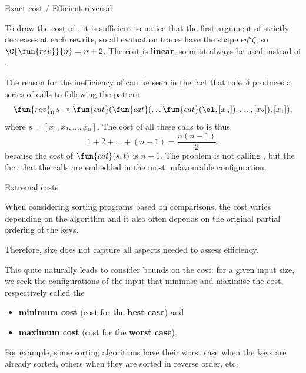%
\begin{frame}{Exact cost / Efficient reversal}

  To draw the cost of , it is sufficient to notice that the
  first argument of  strictly decreases at each rewrite, so
  all evaluation traces have the shape \(\epsilon\eta^n\zeta\), so
  \(\C{\fun{rev}}{n} = n + 2\). The cost is \textbf{linear}, so
   must always be used instead of .

  \bigskip

  The reason for the inefficiency of  can be seen in
  the fact that rule~\(\delta\) produces a series of calls to
   following the pattern
  \begin{equation*}
    \fun{rev}_0\,s \twoheadrightarrow \fun{cat}(\fun{cat}(\dots
    \fun{cat}(\el, [x_n]), \dots, [x_2]), [x_1]),
  \end{equation*}
  where \(s = [x_1, x_2, \dots, x_n]\). The cost of all these calls to
   is thus
  \begin{equation*}
    1 + 2 + \dots + (n-1) = \frac{n(n-1)}{2}.
  \end{equation*}
  because the cost of \(\fun{cat}(s,t)\) is \(n+1\). The problem is
  not calling , but the fact that the calls are embedded in
  the most unfavourable configuration.

\end{frame}

%
\begin{frame}{Extremal costs}

  When considering sorting programs based on comparisons, the cost
  varies depending on the algorithm and it also often depends on the
  original partial ordering of the keys.

  \bigskip

  Therefore, size does not capture all aspects needed to assess
  efficiency.

  \bigskip

  This quite naturally leads to consider bounds on the cost: for a
  given input size, we seek the configurations of the input that
  minimise and maximise the cost, respectively called the
  \begin{itemize}

    \item \textbf{minimum cost} (cost for the \textbf{best case}) and

    \item \textbf{maximum cost} (cost for the \textbf{worst case}).

  \end{itemize}

  \bigskip

  For example, some sorting algorithms have their worst case when the
  keys are already sorted, others when they are sorted in reverse
  order, etc.

\end{frame}

